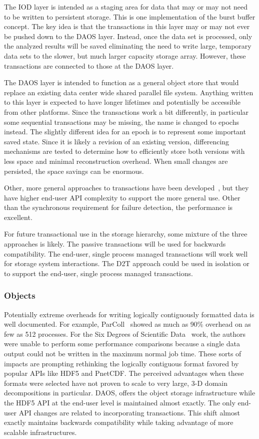 The IOD layer is intended as a staging area for data that may or may not need
to be written to persistent storage. This is one implementation of the burst
buffer concept. The key idea is that the transactions in this layer may or may
not ever be pushed down to the DAOS layer. Instead, once the data set is
processed, only the analyzed results will be saved eliminating the need to
write large, temporary data sets to the slower, but much larger capacity
storage array. However, these transactions are connected to those at the DAOS
layer.

The DAOS layer is intended to function as a general object store that would
replace an existing data center wide shared parallel file system. Anything
written to this layer is expected to have longer lifetimes and potentially be
accessible from other platforms. Since the transactions work a bit differently,
in particular some sequential transactions may be missing, the name is changed
to epochs instead. The slightly different idea for an epoch is to represent
some important saved state. Since it is likely a revision of an existing
version, differencing mechanisms are tested to determine how to efficiently
store both versions with less space and minimal reconstruction overhead. When
small changes are persisted, the space savings can be enormous.

Other, more general approaches to transactions have been
developed~\cite{lofstead:2012:txn-cluster,lofstead:2014:txn-discs}, but they
have higher end-user API complexity to support the more general use. Other than
the synchronous requirement for failure detection, the performance is
excellent.

For future transactional use in the storage hierarchy, some mixture of the
three approaches is likely. The passive transactions will be used for backwards
compatibility. The end-user, single process managed transactions will work well
for storage system interactions. The D2T approach could be used in isolation or
to support the end-user, single process managed transactions.

\subsubsection{Objects}
Potentially extreme overheads for writing logically contiguously formatted data
is well documented. For example, ParColl~\cite{yu:2006:parcoll} showed as much
as 90\% overhead on as few as 512 processes. For the Six Degrees of Scientific
Data~\cite{lofstead:2011:six-degrees} work, the authors were unable to perform
some performance comparisons because a single data output could not be written
in the maximum normal job time. These sorts of impacts are prompting rethinking
the logically contiguous format favored by popular APIs like HDF5 and PnetCDF.
The perceived advantages when these formats were selected have not proven to
scale to very large, 3-D domain decompositions in particular. DAOS, offers the
object storage infrastructure while the HDF5 API at the end-user level is
maintained almost exactly. The only end-user API changes are related to
incorporating transactions. This shift almost exactly maintains backwards
compatibility while taking advantage of more scalable infrastructures.


